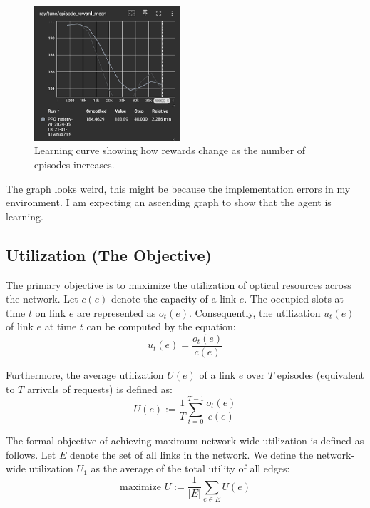 \documentclass[conference]{IEEEtran}
\begin{document}
\begin{figure}[htbp]
\centering
\includegraphics[width=0.48\textwidth]{rewardvsepisode.png}
\caption{Learning curve showing how rewards change as the number of episodes increases.}
\label{fig:learningcurve}
\end{figure}
The graph looks weird, this might be because the implementation errors in my environment. I am expecting an ascending graph to show that the agent is learning.  

\subsection{Utilization (The Objective)}
The primary objective is to maximize the utilization of optical resources across the network. Let \( c(e) \) denote the capacity of a link \( e \). The occupied slots at time \( t \) on link \( e \) are represented as \( o_t(e) \). Consequently, the utilization \( u_t(e) \) of link \( e \) at time \( t \) can be computed by the equation:
\begin{equation}
u_t(e) = \frac{o_t(e)}{c(e)}
\end{equation}

Furthermore, the average utilization \( U(e) \) of a link \( e \) over \( T \) episodes (equivalent to \( T \) arrivals of requests) is defined as:
\begin{equation}
U(e) := \frac{1}{T} \sum_{t=0}^{T-1} \frac{o_t(e)}{c(e)}
\end{equation}

The formal objective of achieving maximum network-wide utilization is defined as follows. Let \( E \) denote the set of all links in the network. We define the network-wide utilization \( U_1 \) as the average of the total utility of all edges:
\begin{equation}
\text{maximize } U := \frac{1}{|E|} \sum_{e \in E} U(e)
\end{equation}
\end{document}

